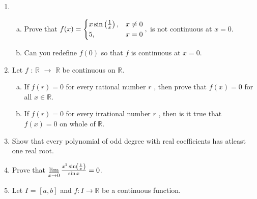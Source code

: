 \documentclass[journal,12pt,onecolumn]{IEEEtran}
\begin{document}
\begin{enumerate}
\begin{enumerate}[(i)]
\end{enumerate}


\item
\setlength\itemsep{2em}
\begin{enumerate}[(a)]

\item Prove that 
 $
f(x)=\begin{cases}
x \sin \left(\frac{1}{x}\right),& x\neq0 \\
5,&x=0
\end{cases}
,$
is not continuous at $x=0$. 
\item Can you redefine $f(0)$ so that $f$ is continuous at $x=0$.
\end{enumerate}

\item Let $f$ : $\mathbb{R}$ $\rightarrow$ $\mathbb{R}$ be continuous on $\mathbb{R}$.

\setlength\itemsep{2em}
\begin{enumerate}[(a)]

\item If $f(r)=0$ for every rational number $r$ , then prove that $f(x)=0$ for all $x\in\mathbb{R}$.
\item If $f(r)=0$ for every irrational number $r$ , then is it true that $f(x)=0$ on whole of $\mathbb{R}$.
\end{enumerate}

\item Show that every polynomial of odd degree with real coefficients has atleast one real root.

\item
Prove that 
$\lim\limits_{x \to 0}{\frac{x^2\sin\left(\frac{1}{x}\right)}{\sin x}}=0$.

\item Let $I$ = $[a,b]$ and $f: I \rightarrow \mathbb{R}$ be a continuous function.


\end{enumerate}
\end{document}
